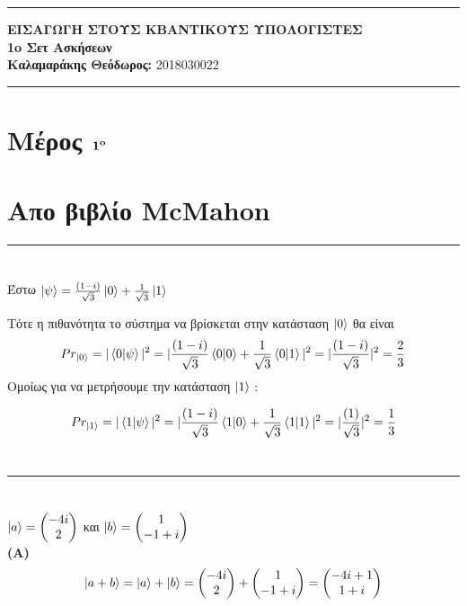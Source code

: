 \documentclass[12pt]{article}
\begin{document}
\greektext

\noindent\rule{\textwidth}{2pt}
\begin{center}
{\bf ΕΙΣΑΓΩΓΗ ΣΤΟΥΣ ΚΒΑΝΤΙΚΟΥΣ ΥΠΟΛΟΓΙΣΤΕΣ}\\ 
{\bf 1o Σετ Ασκήσεων }\\
{\bf Καλαμαράκης Θεόδωρος:} 2018030022\\
\end{center}
\rule{\textwidth}{.5pt}
\noindent

\begin{center}

\end{center}
 
 

\justifying

\section*{{\bf Μέρος  $\bf 1^o$ }}
\section*{Απο βιβλίο \textlatin{McMahon}}
\rule{\textwidth}{.5pt}
\section*{{}}
Έστω $\ket{\psi} = \frac{(1-i)}{\sqrt{3}} \ket{0} + \frac{1}{\sqrt{3}}\ket{1}$

Tότε η πιθανότητα το σύστημα να βρίσκεται στην κατάσταση $\ket{0}$ θα είναι 
$$Pr_{\ket{0}}=|\braket{0|\psi}|^2=|\frac{(1-i)}{\sqrt{3}} \braket{0|0} + \frac{1}{\sqrt{3}}\braket{0|1}|^2=
|\frac{(1-i)}{\sqrt{3}}|^2=\frac{2}{3}$$
Ομοίως για να μετρήσουμε την κατάσταση $\ket{1}$ :

$$Pr_{\ket{1}}=|\braket{1|\psi}|^2=|\frac{(1-i)}{\sqrt{3}} \braket{1|0} + \frac{1}{\sqrt{3}}\braket{1|1}|^2=
|\frac{(1)}{\sqrt{3}}|^2=\frac{1}{3}$$\\
\rule{\textwidth}{.5pt}
\section*{{}}
{\centering
$\ket{a} = \begin{pmatrix} -4i\\2 \end{pmatrix}$ και $\ket{b} = \begin{pmatrix} 1\\-1+i \end{pmatrix}$\\
}
{\bf { (A)}} $$\ket{a+b} = \ket{a}+\ket{b} = \begin{pmatrix} -4i\\2 \end{pmatrix} + \begin{pmatrix} 1\\-1+i \end{pmatrix}=
\begin{pmatrix} -4i+1\\1+i \end{pmatrix}$$
\end{document}
